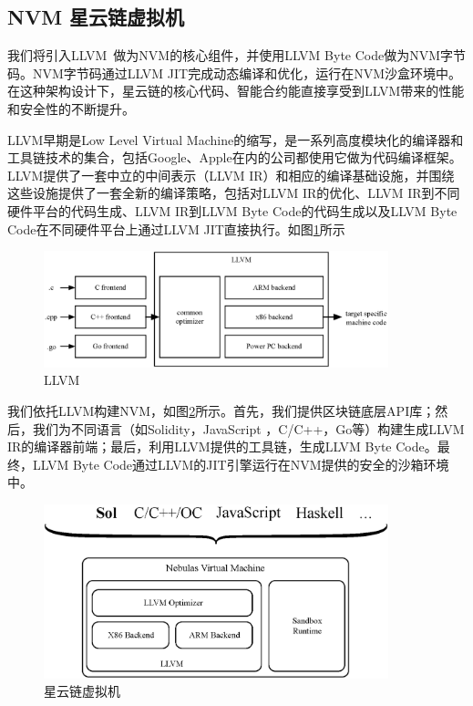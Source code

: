 \subsection{NVM 星云链虚拟机}
\label{sec:nvm}

我们将引入LLVM~\cite{llvm}做为NVM的核心组件，并使用LLVM Byte Code做为NVM字节码。NVM字节码通过LLVM JIT完成动态编译和优化，运行在NVM沙盒环境中。在这种架构设计下，星云链的核心代码、智能合约能直接享受到LLVM带来的性能和安全性的不断提升。

LLVM早期是Low Level Virtual
Machine的缩写，是一系列高度模块化的编译器和工具链技术的集合，包括Google、Apple在内的公司都使用它做为代码编译框架。LLVM提供了一套中立的中间表示（LLVM
IR）和相应的编译基础设施，并围绕这些设施提供了一套全新的编译策略，包括对LLVM
IR的优化、LLVM IR到不同硬件平台的代码生成、LLVM IR到LLVM Byte
Code的代码生成以及LLVM Byte Code在不同硬件平台上通过LLVM
JIT直接执行。如图\ref{fig:llvm}所示


\begin{figure}[h]
\centering
\includegraphics[width=10cm]{./figs/llvm}
\caption{LLVM}
\label{fig:llvm}
\end{figure}

我们依托LLVM构建NVM，如图\ref{fig:nvm}所示。首先，我们提供区块链底层API库；然后，我们为不同语言（如Solidity，JavaScript
，C/C++，Go等）构建生成LLVM
IR的编译器前端；最后，利用LLVM提供的工具链，生成LLVM Byte Code。最终，LLVM Byte
Code通过LLVM的JIT引擎运行在NVM提供的安全的沙箱环境中。

\begin{figure}[h]
\centering
\includegraphics[width=10cm]{./figs/nvm}
\caption{星云链虚拟机}
\label{fig:nvm}
\end{figure}

